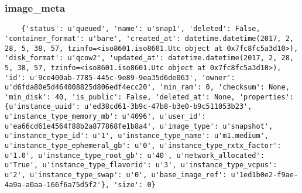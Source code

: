 \documentclass[a4paper,left=1.5cm,right=1.5cm,11pt]{article}
\begin{document}
\subsubsection{image\_meta}
    \begin{lstlisting}
    {'status': u'queued', 'name': u'snap1', 'deleted': False, 'container_format': u'bare', 'created_at': datetime.datetime(2017, 2, 28, 5, 38, 57, tzinfo=<iso8601.iso8601.Utc object at 0x7fc8fc5a3d10>), 'disk_format': u'qcow2', 'updated_at': datetime.datetime(2017, 2, 28, 5, 38, 57, tzinfo=<iso8601.iso8601.Utc object at 0x7fc8fc5a3d10>), 'id': u'9ce400ab-7785-445c-9e89-9ea35d6de063', 'owner': u'd6fda80e5d464008825d806edf4ecc20', 'min_ram': 0, 'checksum': None, 'min_disk': 40, 'is_public': False, 'deleted_at': None, 'properties': {u'instance_uuid': u'ed38cd61-3b9c-47b8-b3e0-b9c511053b23', u'instance_type_memory_mb': u'4096', u'user_id': u'ea66cd61e4564f88b2a877868fe1b8a4', u'image_type': u'snapshot', u'instance_type_id': u'1', u'instance_type_name': u'm1.medium', u'instance_type_ephemeral_gb': u'0', u'instance_type_rxtx_factor': u'1.0', u'instance_type_root_gb': u'40', u'network_allocated': u'True', u'instance_type_flavorid': u'3', u'instance_type_vcpus': u'2', u'instance_type_swap': u'0', u'base_image_ref': u'1ed1b0e2-f9ae-4a9a-a0aa-166f6a75d5f2'}, 'size': 0}
    \end{lstlisting}
\end{document}
